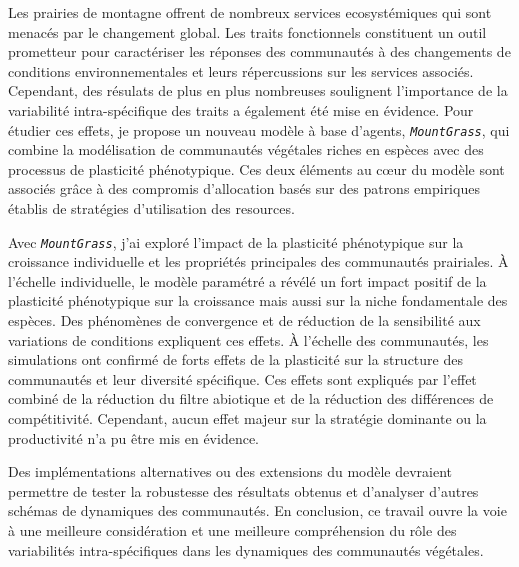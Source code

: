 \documentclass[a4paper, notoc, justified,marginals=left, nobib]{tufte-book}
\newcommand{\model}{\textit{\texttt{MountGrass}}}
\begin{document}
\begin{fullwidth}
\indent Les prairies de montagne offrent de nombreux services ecosystémiques qui sont menacés par le changement global. Les traits fonctionnels constituent un outil prometteur pour caractériser les réponses des communautés à des changements de conditions environnementales et leurs répercussions sur les services associés. Cependant, des résulats de plus en plus nombreuses soulignent l'importance de la variabilité intra-spécifique des traits a également été mise en évidence. 
Pour étudier ces effets, je propose un nouveau modèle à base d'agents, \model, qui combine la modélisation de communautés végétales riches en espèces avec des processus de plasticité phénotypique. Ces deux éléments au c\oe{}ur du modèle sont associés grâce à des compromis d'allocation basés sur des patrons empiriques établis de stratégies d'utilisation des resources.

Avec \model, j'ai exploré l'impact de la plasticité phénotypique sur la croissance individuelle et les propriétés principales des communautés prairiales. \`A l'échelle individuelle, le modèle paramétré a révélé un fort impact positif de la plasticité phénotypique sur la croissance mais aussi sur la niche fondamentale des espèces. Des phénomènes de convergence et de réduction de la sensibilité aux variations de conditions expliquent ces effets. \`A l'échelle des communautés, les simulations ont confirmé de forts effets de la plasticité sur la structure des communautés et leur diversité spécifique. Ces effets sont expliqués par l'effet combiné de la réduction du filtre abiotique et de la réduction des différences de compétitivité. Cependant, aucun effet majeur sur la stratégie dominante ou la productivité n'a pu être mis en évidence.

Des implémentations alternatives ou des extensions du modèle devraient permettre de tester la robustesse des résultats obtenus et d'analyser d'autres schémas de dynamiques des communautés. En conclusion, ce travail ouvre la voie à une meilleure considération et une meilleure compréhension du rôle des variabilités intra-spécifiques dans les dynamiques des communautés végétales.



\end{fullwidth}
\end{document}
